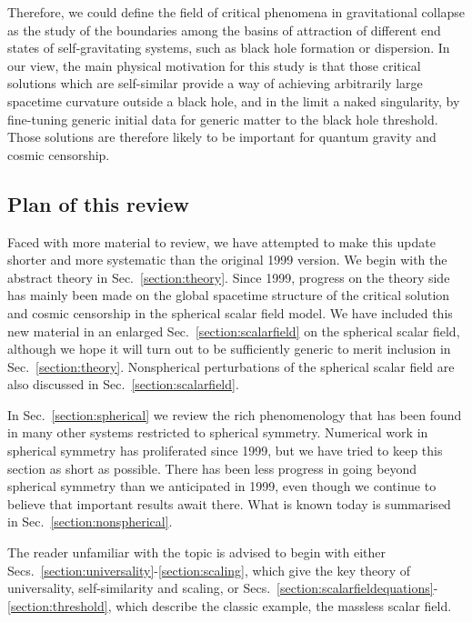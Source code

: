 \documentclass{article}
\begin{document}
Therefore, we could define the field of critical phenomena in
gravitational collapse as the study of the boundaries among the basins
of attraction of different end states of self-gravitating systems,
such as black hole formation or dispersion. In our view, the
main physical motivation for this study is that those critical solutions
which are self-similar provide a way of achieving arbitrarily large
spacetime curvature outside a black hole, and in the limit a naked
singularity, by fine-tuning generic initial data for generic matter
to the black hole threshold. Those solutions are therefore likely
to be important for quantum gravity and cosmic censorship.



\subsection{Plan of this review}

Faced with more material to review, we have attempted to make this
update shorter and more systematic than the original 1999 version. We
begin with the abstract theory in Sec.~\ref{section:theory}.
Since 1999, progress on the theory side
has mainly been made on the global spacetime structure of the critical
solution and cosmic censorship in the spherical scalar field model. We
have included this new material in an enlarged
Sec.~\ref{section:scalarfield} on the spherical scalar field, although
we hope it will turn out to be sufficiently generic to merit inclusion
in Sec.~\ref{section:theory}. Nonspherical perturbations of the
spherical scalar field are also discussed in
Sec.~\ref{section:scalarfield}.

In Sec.~\ref{section:spherical} we review the rich phenomenology that
has been found in many other systems restricted to spherical
symmetry. Numerical work in spherical symmetry has proliferated since
1999, but we have tried to keep this section as short as possible.
There has been less progress in going beyond spherical symmetry than
we anticipated in 1999, even though we continue to believe that
important results await there. What is known today is summarised in
Sec.~\ref{section:nonspherical}.

The reader unfamiliar with the topic is advised to begin
with either Secs.~\ref{section:universality}-\ref{section:scaling},
which give the key theory of universality, self-similarity and
scaling, or
Secs.~\ref{section:scalarfieldequations}-\ref{section:threshold},
which describe the classic example, the massless scalar field.
\end{document}
